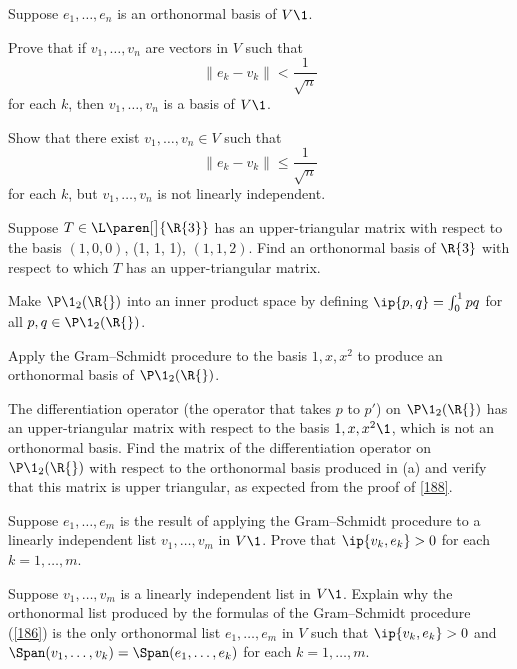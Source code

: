 \exercise
Suppose $e_1, \dots, e_n$ is an orthonormal basis of $V\1$.
\begin{subtheorem}
\item
Prove that if $v_1, \dots, v_n$ are vectors in $V$ such that
\[
\|e_k - v_k\| < \frac{1}{\sqrt{n}}
\]
for each $k$, then $v_1, \dots, v_n$ is a basis of $V\1$.

\item
Show that there exist $v_1, \ldots, v_n \in V$ such that
\[
\|e_k - v_k\| \le \frac{1}{\sqrt{n}}
\]
for each $k$, but $v_1, \ldots, v_n$ is not linearly independent.
\end{subtheorem}


\exercise
Suppose $T \in \L\paren[\big]{\R{3}}$ has an upper-triangular matrix with respect to the basis $(1, 0, 0)$, (1, 1, 1), $(1, 1, 2)$. Find an orthonormal basis of $\R{3}$ with respect to which $T$ has an upper-triangular matrix.


\exercise
Make $\P\1_2(\R{})$ into an inner product space by defining \label{375}
$
\ip{p, q} = \int_0^1 pq
$
for all $p, q \in \P\1_2(\R{})$.
\begin{subtheorem}
\item
Apply the Gram--Schmidt procedure to the basis $1, x, x^2$ to produce an
orthonormal basis of $\P\1_2(\R{})$.
\item
The differentiation operator \big(the operator that
takes $p$ to $p'$\big) on $\P\1_2(\R{})$ has an upper-triangular matrix with respect to
the basis $1, x, x^2\1$, which is not an orthonormal basis. Find the matrix of the differentiation operator on $\P\1_2(\R{})$ with respect to the orthonormal basis produced in (a) and verify that this matrix is upper triangular, as expected from the proof of \ref{188}.
\end{subtheorem}
\exercisesubtheoremend


\exercise
Suppose $e_1, \dots, e_m$ is the result of applying the Gram--Schmidt procedure to a linearly independent list $v_1, \dots, v_m$ in $V\1$. Prove that $\ip{v_k, e_k} > 0$ for each $k = 1, \dots, m$.


\exercise
Suppose $v_1, \dots, v_m$ is a linearly independent list in $V\1$. Explain why the orthonormal list produced by the formulas of the Gram--Schmidt procedure (\ref{186}) is the only orthonormal list $e_1, \ldots, e_m$ in $V$ such that $\ip{v_k, e_k} > 0$ and
$\Span(v_1, \ldots, v_k) = \Span(e_1, \ldots, e_k)$ for each $k = 1, \ldots, m$. \label{8GSunique}


